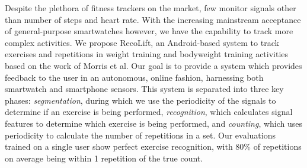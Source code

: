 Despite the plethora of fitness trackers on the market, few monitor signals other than number of steps and heart rate. With the increasing mainstream acceptance of general-purpose smartwatches however, we have the capability to track more complex activities. We propose RecoLift, an Android-based system to track exercises and repetitions in weight training and bodyweight training activities based on the work of Morris et al. Our goal is to provide a system which provides feedback to the user in an autonomous, online fashion, harnessing both smartwatch and smartphone sensors. This system is separated into three key phases: \textit{segmentation}, during which we use the periodicity of the signals to determine if an exercise is being performed, \textit{recognition}, which calculates signal features to determine which exercise is being performed, and \textit{counting}, which uses periodicity to calculate the number of repetitions in a set. Our evaluations trained on a single user show perfect exercise recognition, with 80\% of repetitions on average being within 1 repetition of the true count. 